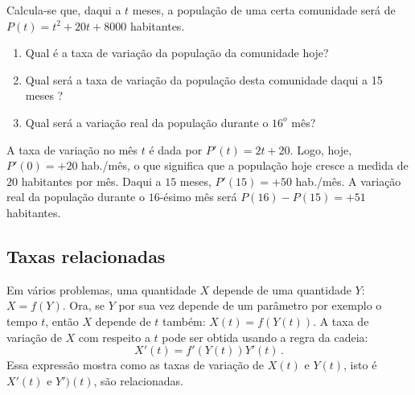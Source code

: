 \begin{exo}
Calcula-se que, daqui a $t$ meses, 
a população de uma certa comunidade será de
$P(t) = t^2 + 20t + 8000$ habitantes.
\begin{enumerate}
\item Qual é a taxa de variação da população da comunidade hoje?
\item Qual será a taxa de variação da população 
desta comunidade daqui a 15 meses ?
\item Qual será a variação real da população durante o $16^o$ 
mês?
\end{enumerate}
\begin{sol}
A taxa de variação no mês $t$ é dada por $P'(t)=2t+20$. Logo, hoje,
$P'(0)=+20$ hab./mês, o que significa que a população hoje cresce a medida de
$20$ habitantes por mês. Daqui a $15$ meses, $P'(15)=+50$ hab./mês. A
variação real da população durante o $16$-ésimo mês será $P(16)-P(15)=+51$
habitantes.
\end{sol}
\end{exo}

\subsection{Taxas relacionadas}
Em vários problemas, uma quantidade $X$ depende de uma quantidade $Y$:
$X=f(Y)$. 
Ora, se $Y$ por sua vez depende de um parâmetro por exemplo o tempo $t$,
então $X$ depende de $t$ também: $X(t)=f(Y(t))$. A taxa de variação de $X$
com respeito a $t$ pode ser obtida usando a regra da
cadeia: 
\[
X'(t)=f'(Y(t))Y'(t)\,.
\]
Essa expressão mostra como as taxas de variação de $X(t)$ e $Y(t)$, 
isto é $X'(t)$ e $Y')(t)$, são relacionadas.

